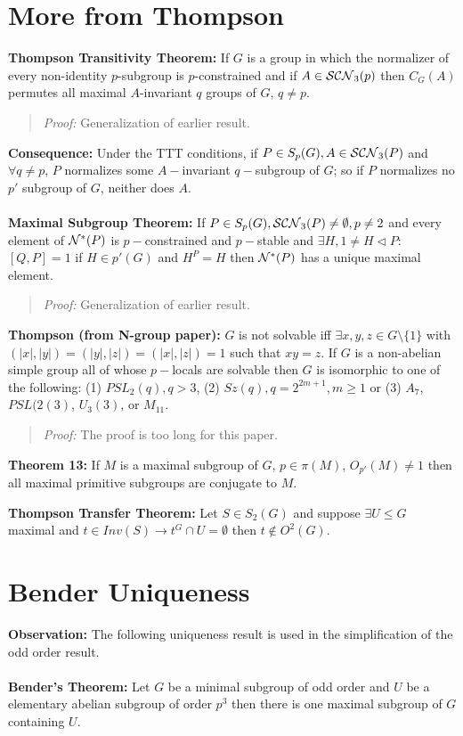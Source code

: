\section{More from Thompson}
{\bf Thompson Transitivity Theorem:}  If $G$ is a group in which
the normalizer of every non-identity $p$-subgroup is $p$-constrained
and if $A \in {\cal SCN}_3(p)$ then $C_G(A)$ permutes all
maximal $A$-invariant $q$ groups of $G$, $q \ne p$. 
\begin{quote}
\emph{Proof:}  
Generalization of earlier result.
\end{quote}
{\bf Consequence:}
Under the TTT conditions, if $P \in S_p(G), A \in {\cal SCN}_3(P)$ and $\forall q \ne p$,
$P$ normalizes some $A-$invariant $q-$subgroup of $G$; so if $P$ normalizes no
$p'$ subgroup of $G$, neither does $A$.  
\\
\\
{\bf Maximal Subgroup Theorem:}
If $P \in S_p(G), {\cal SCN}_3(P) \ne \emptyset, p \ne 2$ and every element of 
${\cal N}^*(P)$
is $p-$constrained and $p-$stable and $\exists H, 1 \ne H \lhd P$: $[Q,P]=1$ if $H \in p'(G)$
and $H^P=H$ then ${\cal N}^*(P)$ has a unique maximal element.
\begin{quote}
\emph{Proof:}  
Generalization of earlier result.
\end{quote}
{\bf Thompson (from N-group paper):} $G$ is not solvable iff 
$\exists x, y, z \in G \setminus \{1\}$
with $(|x|, |y|)=(|y|,|z|)=(|x|,|z|)=1$ such that $xy=z$.  If $G$ is a non-abelian
simple group all of whose $p-$locals are solvable then $G$ is isomorphic to one
of the following: (1) $PSL_2 (q), q > 3$, (2) $Sz(q), q= 2^{2m+1}, m \ge 1$ or (3)
$A_7$, $PSL(2(3)$, $U_3(3)$, or $M_{11}$.
\begin{quote}
\emph{Proof:}  
The proof is too long for this paper.
\end{quote}
{\bf Theorem 13:} If $M$ is a maximal subgroup of $G$, $p \in \pi(M)$, $O_{p'}(M) \ne 1$ 
then all maximal primitive subgroups are conjugate to $M$.
\begin{quote}
\end{quote}
{\bf Thompson Transfer Theorem:} Let $S \in S_2(G)$ and suppose $\exists U \le G$ maximal
and $t \in Inv(S) \rightarrow t^G \cap U = \emptyset$ then $t \notin O^2(G)$.
\begin{quote}
\end{quote}
\section{Bender Uniqueness}
{\bf Observation:} The following uniqueness result is used in the simplification of the
odd order result.
\\
\\
{\bf Bender's Theorem:}
Let $G$ be a minimal subgroup of odd order and $U$ be a elementary abelian subgroup of
order $p^3$ then there is one maximal subgroup of $G$ containing $U$.
